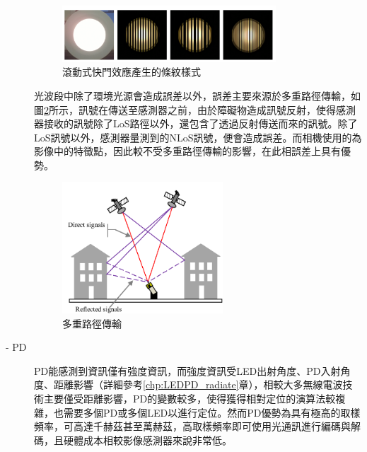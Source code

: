 \begin{description}
                    \begin{figure}[ht]
                        \centering
                        \includegraphics[width=8cm]{ch2pic/rolling_shutter_case.png}
                        \caption{滾動式快門效應產生的條紋樣式\cite{pic:rolling_shutter_case}}
                        \label{pic:rolling_shutter_case}
                    \end{figure}

                    \qquad
                    光波段中除了環境光源會造成誤差以外，誤差主要來源於多重路徑傳輸，如圖\ref{pic:multipath}所示，訊號在傳送至感測器之前，由於障礙物造成訊號反射，使得感測器接收的訊號除了LoS路徑以外，還包含了透過反射傳送而來的訊號。除了LoS訊號以外，感測器量測到的NLoS訊號，便會造成誤差。而相機使用的為影像中的特徵點，因此較不受多重路徑傳輸的影響，在此相誤差上具有優勢。

                    \begin{figure}[ht]
                        \centering
                        \includegraphics[width=6cm]{ch2pic/multipath.png}
                        \caption{多重路徑傳輸\cite{pic:multipath}}
                        \label{pic:multipath}
                    \end{figure}

                    \item[- PD]\hfill
                    
                    \qquad
                    PD能感測到資訊僅有強度資訊，而強度資訊受LED出射角度、PD入射角度、距離影響（詳細參考\ref{chp:LEDPD_radiate}章），相較大多無線電波技術主要僅受距離影響，PD的變數較多，使得獲得相對定位的演算法較複雜，也需要多個PD或多個LED以進行定位。然而PD優勢為具有極高的取樣頻率，可高達千赫茲甚至萬赫茲，高取樣頻率即可使用光通訊進行編碼與解碼，且硬體成本相較影像感測器來說非常低。


\end{description}
